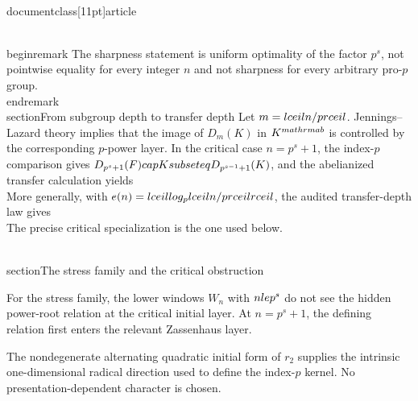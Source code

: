 \\documentclass[11pt]{article}
\begin{document}
\\begin{remark}
The sharpness statement is uniform optimality of the factor $p^s$, not pointwise equality for every integer $n$ and not sharpness for every arbitrary pro-$p$ group.
\\end{remark}
\\section{From subgroup depth to transfer depth}
Let $m=\\lceil n/p\\rceil$. Jennings--Lazard theory implies that the image of
$D_m(K)$ in $K^{\\mathrm{ab}}$ is controlled by the corresponding $p$-power layer. In the critical case $n=p^s+1$, the index-$p$ comparison gives
$D_{p^s+1}(F)\\cap K\\subseteq D_{p^{s-1}+1}(K)$, and the abelianized transfer calculation yields
\\[
\\operatorname{im}(D_{p^s+1}(F)\\cap K\\to K^{\\mathrm{ab}})
\\subseteq p^sK^{\\mathrm{ab}}.
\\]
More generally, with
$e(n)=\\lceil\\log_p\\lceil n/p\\rceil\\rceil$,
the audited transfer-depth law gives
\\[
\\operatorname{im}(D_n(F)\\cap K\\to K^{\\mathrm{ab}})
\\subseteq p^{e(n)}K^{\\mathrm{ab}}.
\\]
The precise critical specialization is the one used below.

\\section{The stress family and the critical obstruction}

For the stress family, the lower windows $W_n$ with $n\\le p^s$ do not see the hidden power-root relation at the critical initial layer. At $n=p^s+1$, the defining relation first enters the relevant Zassenhaus layer.

The nondegenerate alternating quadratic initial form of $r_2$ supplies the intrinsic one-dimensional radical direction used to define the index-$p$ kernel. No presentation-dependent character is chosen.
\end{document}
